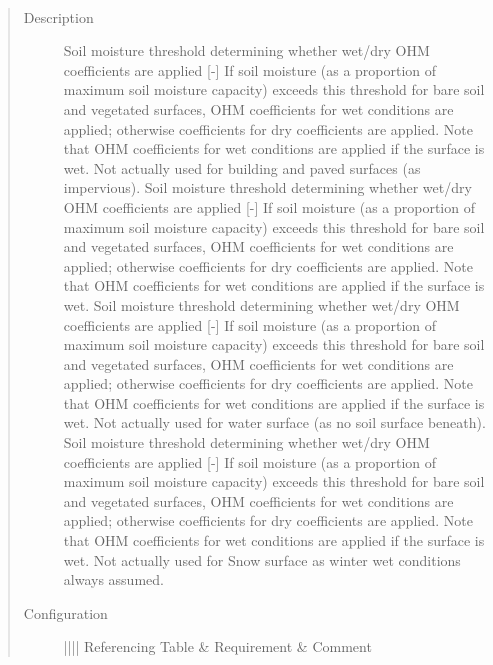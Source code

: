 \documentclass[letterpaper,10pt,english]{sphinxmanual}
\begin{document}

\begin{fulllineitems}
\label{\detokenize{input_files/SUEWS_SiteInfo/Input_Options:cmdoption-arg-ohmthresh-wd}}~\begin{quote}\begin{description}
\item[{Description}] \leavevmode
Soil moisture threshold determining whether wet/dry OHM coefficients are applied {[}-{]} If soil moisture (as a proportion of maximum soil moisture capacity) exceeds this threshold for bare soil and vegetated surfaces, OHM coefficients for wet conditions are applied; otherwise coefficients for dry coefficients are applied. Note that OHM coefficients for wet conditions are applied if the surface is wet. Not actually used for building and paved surfaces (as impervious).  Soil moisture threshold determining whether wet/dry OHM coefficients are applied {[}-{]} If soil moisture (as a proportion of maximum soil moisture capacity) exceeds this threshold for bare soil and vegetated surfaces, OHM coefficients for wet conditions are applied; otherwise coefficients for dry coefficients are applied. Note that OHM coefficients for wet conditions are applied if the surface is wet.  Soil moisture threshold determining whether wet/dry OHM coefficients are applied {[}-{]} If soil moisture (as a proportion of maximum soil moisture capacity) exceeds this threshold for bare soil and vegetated surfaces, OHM coefficients for wet conditions are applied; otherwise coefficients for dry coefficients are applied. Note that OHM coefficients for wet conditions are applied if the surface is wet. Not actually used for water surface (as no soil surface beneath).  Soil moisture threshold determining whether wet/dry OHM coefficients are applied {[}-{]} If soil moisture (as a proportion of maximum soil moisture capacity) exceeds this threshold for bare soil and vegetated surfaces, OHM coefficients for wet conditions are applied; otherwise coefficients for dry coefficients are applied. Note that OHM coefficients for wet conditions are applied if the surface is wet. Not actually used for Snow surface as winter wet conditions always assumed.

\item[{Configuration}] \leavevmode

\begin{savenotes}\sphinxatlongtablestart\begin{longtable}{||||}
\hline
\sphinxstyletheadfamily 
Referencing Table
&\sphinxstyletheadfamily 
Requirement
&\sphinxstyletheadfamily 
Comment
\\
\hline
\endfirsthead


\end{longtable}
\end{savenotes}
\end{description}
\end{quote}
\end{fulllineitems}
\end{document}

